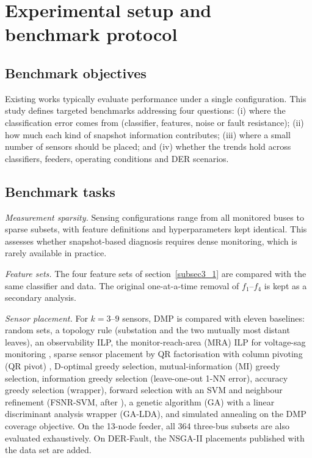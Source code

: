 \documentclass[11pt]{article}
\newenvironment{nw}{}{}
\begin{document}
\section{Experimental setup and benchmark protocol}\label{sec4}

\subsection{Benchmark objectives}\label{subsec4_1}

\begin{nw}
Existing works typically evaluate performance under a single configuration. This study defines targeted benchmarks addressing four questions: (i) where the classification error comes from (classifier, features, noise or fault resistance); (ii) how much each kind of snapshot information contributes; (iii) where a small number of sensors should be placed; and (iv) whether the trends hold across classifiers, feeders, operating conditions and DER scenarios.
\end{nw}

\subsection{Benchmark tasks}\label{subsec4_2}

\textit{Measurement sparsity.} Sensing configurations range from all monitored buses to sparse subsets, with feature definitions and hyperparameters kept identical. This assesses whether snapshot-based diagnosis requires dense monitoring, which is rarely available in practice.

\begin{nw}
\textit{Feature sets.} The four feature sets of section~\ref{subsec3_1} are compared with the same classifier and data. The original one-at-a-time removal of $f_1$--$f_4$ is kept as a secondary analysis.

\textit{Sensor placement.} For $k=3$--$9$ sensors, DMP is compared with eleven baselines: random sets, a topology rule (substation and the two mutually most distant leaves), an observability ILP, the monitor-reach-area (MRA) ILP for voltage-sag monitoring \cite{olguin2006,wang2021}, sparse sensor placement by QR factorisation with column pivoting (QR pivot) \cite{manohar2018}, D-optimal greedy selection, mutual-information (MI) greedy selection, information greedy selection (leave-one-out 1-NN error), accuracy greedy selection (wrapper), forward selection with an SVM and neighbour refinement (FSNR-SVM, after \cite{khattak2025}), a genetic algorithm (GA) with a linear discriminant analysis wrapper (GA-LDA), and simulated annealing on the DMP coverage objective. On the 13-node feeder, all 364 three-bus subsets are also evaluated exhaustively. On DER-Fault, the NSGA-II placements published with the data set \cite{derfault,deb2002,andreoni2021} are added.
\end{nw}
\end{document}
